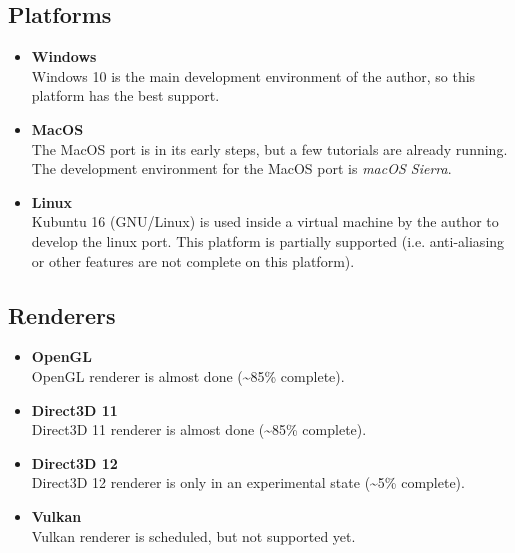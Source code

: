 \documentclass{article}
\begin{document}
\subsection*{Platforms}
\begin{itemize}
	\item \textbf{Windows} \\
	Windows 10 is the main development environment of the author, so this platform has the best support.
	
	\item \textbf{MacOS} \\
	The MacOS port is in its early steps, but a few tutorials are already running.
	The development environment for the MacOS port is \emph{macOS Sierra}.
	
	\item \textbf{Linux} \\
	Kubuntu 16 (GNU/Linux) is used inside a virtual machine by the author to develop the linux port.
	This platform is partially supported (i.e. anti-aliasing or other features are not complete on this platform).
\end{itemize}
	
\subsection*{Renderers}
\begin{itemize}
	\item \textbf{OpenGL} \\
	OpenGL renderer is almost done (\textasciitilde 85\% complete).
	
	\item \textbf{Direct3D 11} \\
	Direct3D 11 renderer is almost done (\textasciitilde 85\% complete).
	
	\item \textbf{Direct3D 12} \\
	Direct3D 12 renderer is only in an experimental state (\textasciitilde 5\% complete).
	
	\item \textbf{Vulkan} \\
	Vulkan renderer is scheduled, but not supported yet.
\end{itemize}


\end{document}
